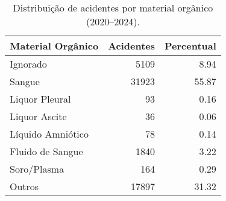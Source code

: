\begin{table}
\caption{Distribuição de acidentes por material orgânico (2020–2024).}
\begin{tabular}{lrr}
\toprule
Material Orgânico & Acidentes & Percentual \\
\midrule
Ignorado & 5109 & 8.94 \\
Sangue & 31923 & 55.87 \\
Liquor Pleural & 93 & 0.16 \\
Liquor Ascite & 36 & 0.06 \\
Líquido Amniótico & 78 & 0.14 \\
Fluido de Sangue & 1840 & 3.22 \\
Soro/Plasma & 164 & 0.29 \\
Outros & 17897 & 31.32 \\
\bottomrule
\end{tabular}
\end{table}
